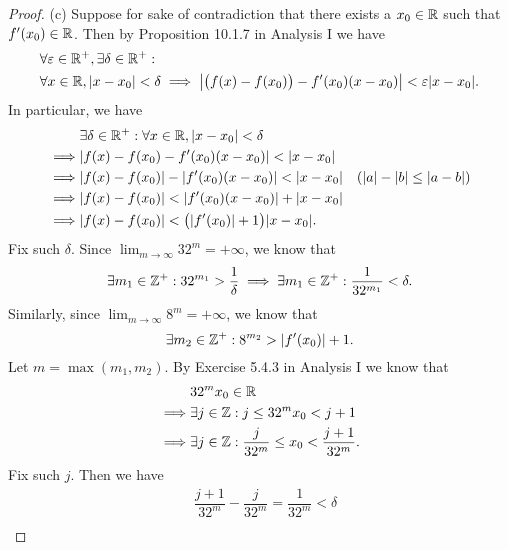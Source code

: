 \begin{proof}{(c)}
  Suppose for sake of contradiction that there exists a \(x_0 \in \mathbb{R}\) such that \(f'(x_0) \in \mathbb{R}\).
  Then by Proposition 10.1.7 in Analysis I we have
  \begin{align*}
     & \forall \varepsilon \in \R^+, \exists \delta \in \R^+ :                                                                          \\
     & \forall x \in \R, \abs{x - x_0} < \delta \implies \abs{\big(f(x) - f(x_0)\big) - f'(x_0) (x - x_0)} < \varepsilon \abs{x - x_0}.
  \end{align*}
  In particular, we have
  \begin{align*}
             & \exists \delta \in \R^+ : \forall x \in \R, \abs{x - x_0} < \delta                                        \\
    \implies & \abs{f(x) - f(x_0) - f'(x_0) (x - x_0)} < \abs{x - x_0}                                                   \\
    \implies & \abs{f(x) - f(x_0)} - \abs{f'(x_0) (x - x_0)} < \abs{x - x_0}      & (\abs{a} - \abs{b} \leq \abs{a - b}) \\
    \implies & \abs{f(x) - f(x_0)} < \abs{f'(x_0) (x - x_0)} + \abs{x - x_0}                                             \\
    \implies & \abs{f(x) - f(x_0)} < \big(\abs{f'(x_0)} + 1\big) \abs{x - x_0}.
  \end{align*}
  Fix such \(\delta\).
  Since \(\lim_{m \to \infty} 32^m = +\infty\), we know that
  \[
    \exists m_1 \in \mathbb{Z}^+ : 32^{m_1} > \dfrac{1}{\delta} \implies \exists m_1 \in \mathbb{Z}^+ : \dfrac{1}{32^{m_1}} < \delta.
  \]
  Similarly, since \(\lim_{m \to \infty} 8^m = +\infty\), we know that
  \[
    \exists m_2 \in \mathbb{Z}^+ : 8^{m_2} > \left\lvert f'(x_0)\right\rvert + 1.
  \]
  Let \(m = \max(m_1, m_2)\).
  By Exercise 5.4.3 in Analysis I we know that
  \begin{align*}
             & 32^m x_0 \in \mathbb{R}                                                    \\
    \implies & \exists j \in \mathbb{Z} : j \leq 32^m x_0 < j + 1                         \\
    \implies & \exists j \in \mathbb{Z} : \dfrac{j}{32^m} \leq x_0 < \dfrac{j + 1}{32^m}.
  \end{align*}
  Fix such \(j\).
  Then we have
  \begin{align*}
             & \dfrac{j + 1}{32^m} - \dfrac{j}{32^m} = \dfrac{1}{32^m} < \delta                                                                                \\

\end{align*}
\end{proof}
